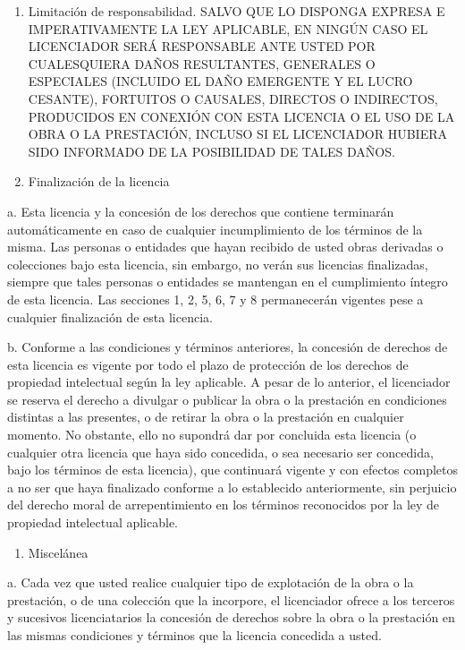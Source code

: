 \documentclass[11pt]{article}
\begin{document}
{{\begin{enumerate}
\item Limitación de responsabilidad. SALVO QUE LO DISPONGA EXPRESA E
   IMPERATIVAMENTE LA LEY APLICABLE, EN NINGÚN CASO EL LICENCIADOR
   SERÁ RESPONSABLE ANTE USTED POR CUALESQUIERA DAÑOS RESULTANTES,
   GENERALES O ESPECIALES (INCLUIDO EL DAÑO EMERGENTE Y EL LUCRO
   CESANTE), FORTUITOS O CAUSALES, DIRECTOS O INDIRECTOS, PRODUCIDOS
   EN CONEXIÓN CON ESTA LICENCIA O EL USO DE LA OBRA O LA PRESTACIÓN,
   INCLUSO SI EL LICENCIADOR HUBIERA SIDO INFORMADO DE LA POSIBILIDAD
   DE TALES DAÑOS.
\item Finalización de la licencia
\end{enumerate}
a. Esta licencia y la concesión de los derechos que contiene terminarán automáticamente en caso de cualquier incumplimiento de los términos de la misma. Las personas o entidades que hayan recibido de usted obras derivadas o colecciones bajo esta licencia, sin embargo, no verán sus licencias finalizadas, siempre que tales personas o entidades se mantengan en el cumplimiento íntegro de esta licencia. Las secciones 1, 2, 5, 6, 7 y 8 permanecerán vigentes pese a cualquier finalización de esta licencia. 

b. Conforme a las condiciones y términos anteriores, la concesión de derechos de esta licencia es vigente por todo el plazo de protección de los derechos de propiedad intelectual según la ley aplicable. A pesar de lo anterior, el licenciador se reserva el derecho a divulgar o publicar la obra o la prestación en condiciones distintas a las presentes, o de retirar la obra o la prestación en cualquier momento. No obstante, ello no supondrá dar por concluida esta licencia (o cualquier otra licencia que haya sido concedida, o sea necesario ser concedida, bajo los términos de esta licencia), que continuará vigente y con efectos completos a no ser que haya finalizado conforme a lo establecido anteriormente, sin perjuicio del derecho moral de arrepentimiento en los términos reconocidos por la ley de propiedad intelectual aplicable. 

\begin{enumerate}
\item Miscelánea
\end{enumerate}
a. Cada vez que usted realice cualquier tipo de explotación de la obra o la prestación, o de una colección que la incorpore, el licenciador ofrece a los terceros y sucesivos licenciatarios la concesión de derechos sobre la obra o la prestación en las mismas condiciones y términos que la licencia concedida a usted. 

}}
\end{document}
